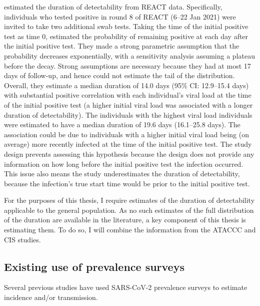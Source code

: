 \documentclass[thesis.tex]{subfiles}
\begin{document}
\Textcite{ealesCharacterising} estimated the duration of detectability from REACT data.
Specifically, individuals who tested positive in round 8 of REACT (6--22 Jan 2021) were invited to take two additional swab tests.
Taking the time of the initial positive test as time 0, \textcite{ealesCharacterising} estimated the probability of remaining positive at each day after the initial positive test.
They made a strong parametric assumption that the probability decreases exponentially, with a sensitivity analysis assuming a plateau before the decay.
Strong assumptions are necessary because they had at most 17 days of follow-up, and hence could not estimate the tail of the distribution.
Overall, they estimate a median duration of 14.0 days (95\% CI: 12.9--15.4 days) with substantial positive correlation with each individual’s viral load at the time of the initial positive test (\ie a higher initial viral load was associated with a longer duration of detectability).
The individuals with the highest viral load individuals were estimated to have a median duration of 19.6 days (16.1--25.8 days).
The association could be due to individuals with a higher initial viral load being (on average) more recently infected at the time of the initial positive test.
The study design prevents assessing this hypothesis because the design does not provide any information on how long before the initial positive test the infection occurred.
This issue also means the study underestimates the duration of detectability, because the infection's true start time would be prior to the initial positive test.

For the purposes of this thesis, I require estimates of the duration of detectability applicable to the general population.
As no such estimates of the full distribution of the duration are available in the literature, a key component of this thesis is estimating them.
To do so, I will combine the information from the ATACCC and CIS studies.


\subsection{Existing use of prevalence surveys}

Several previous studies have used SARS-CoV-2 prevalence surveys to estimate incidence and/or transmission.
\end{document}
